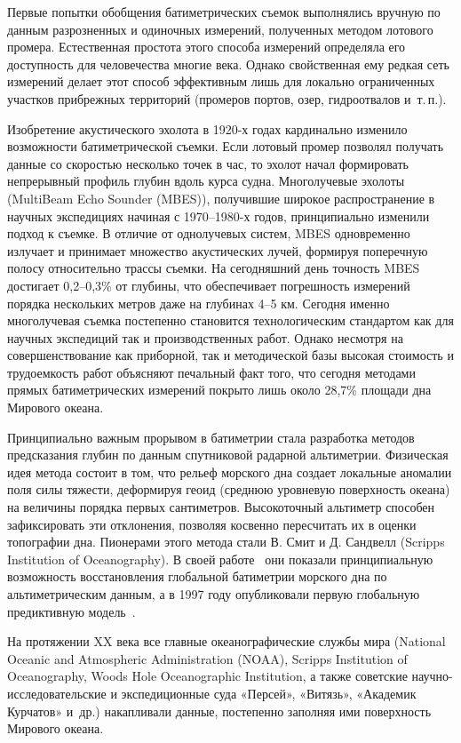 Первые попытки обобщения батиметрических съемок выполнялись вручную по данным разрозненных и одиночных измерений, полученных методом лотового промера.
Естественная простота этого способа измерений определяла его доступность для человечества многие века.
Однако свойственная ему редкая сеть измерений делает этот способ эффективным лишь для локально ограниченных участков прибрежных территорий (промеров портов, озер, гидроотвалов и~т.\,п.).

Изобретение акустического эхолота в 1920-х годах кардинально изменило возможности батиметрической съемки. 
Если лотовый промер позволял получать данные со скоростью несколько точек в час, то эхолот начал формировать непрерывный профиль глубин вдоль курса судна. 
Многолучевые эхолоты (MultiBeam Echo Sounder (MBES)), получившие широкое распространение в научных экспедициях начиная с 1970–1980-х годов, принципиально изменили подход к съемке. 
В отличие от однолучевых систем, MBES одновременно излучает и принимает множество акустических лучей, формируя поперечную полосу относительно трассы съемки. 
На сегодняшний день точность MBES достигает 0,2–0,3\% от глубины, что обеспечивает погрешность измерений порядка нескольких метров даже на глубинах 4–5 км.
Сегодня именно многолучевая съемка постепенно становится технологическим стандартом как для научных экспедиций так и производственных работ.
Однако несмотря на совершенствование как приборной, так и методической базы высокая стоимость и трудоемкость работ объясняют печальный факт того, что сегодня методами прямых батиметрических измерений покрыто лишь около 28,7\% площади дна Мирового океана.

Принципиально важным прорывом в батиметрии стала разработка методов предсказания глубин по данным спутниковой радарной альтиметрии. 
Физическая идея метода состоит в том, что рельеф морского дна создает локальные аномалии поля силы тяжести, деформируя геоид (среднюю уровневую поверхность океана) на величины порядка первых сантиметров.
Высокоточный альтиметр способен зафиксировать эти отклонения, позволяя косвенно пересчитать их в оценки топографии дна.
Пионерами этого метода стали В. Смит и Д. Сандвелл (Scripps Institution of Oceanography). 
В своей работе~\cite{SmithSandwell1994} они показали принципиальную возможность восстановления глобальной батиметрии морского дна по альтиметрическим данным, а в 1997 году опубликовали первую глобальную предиктивную модель~\cite{SmithSandwell1997}.

На протяжении XX века все главные океанографические службы мира (National Oceanic and Atmospheric Administration (NOAA), Scripps Institution of Oceanography, Woods Hole Oceanographic Institution, а также советские научно-исследовательские и экспедиционные суда «Персей», «Витязь», «Академик Курчатов» и~др.) накапливали данные, постепенно заполняя ими поверхность Мирового океана.


